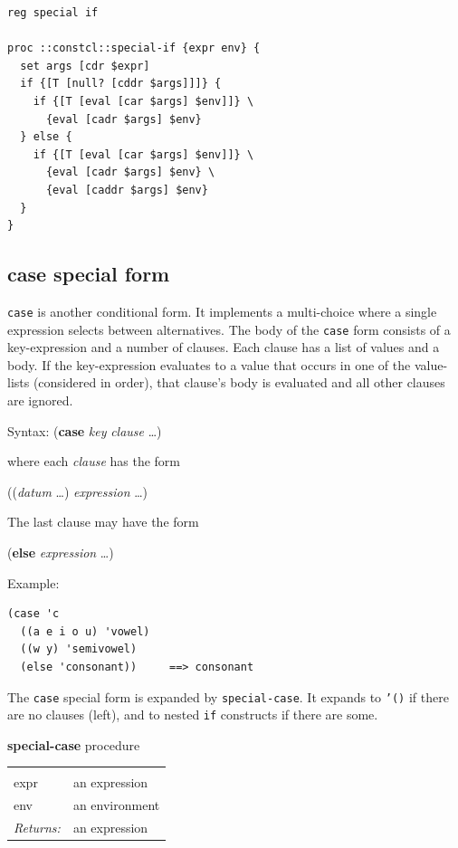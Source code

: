 \documentclass[twoside]{report}
\begin{document}
\begin{lstlisting}
reg special if

proc ::constcl::special-if {expr env} {
  set args [cdr $expr]
  if {[T [null? [cddr $args]]]} {
    if {[T [eval [car $args] $env]]} \
      {eval [cadr $args] $env}
  } else {
    if {[T [eval [car $args] $env]]} \
      {eval [cadr $args] $env} \
      {eval [caddr $args] $env}
  }
}
\end{lstlisting}

\subsection{case special form}
\label{case-special-form}

\texttt{case} is another conditional form. It implements a multi-choice where a single expression selects between alternatives. The body of the \texttt{case} form consists of a key-expression and a number of clauses. Each clause has a list of values and a body. If the key-expression evaluates to a value that occurs in one of the value-lists (considered in order), that clause's body is evaluated and all other clauses are ignored.

Syntax: (\textbf{case} \emph{key} \emph{clause} \ldots )

where each \emph{clause} has the form

((\emph{datum} \ldots ) \emph{expression} \ldots )

The last clause may have the form

(\textbf{else} \emph{expression} \ldots )

Example:

\begin{verbatim}
(case 'c
  ((a e i o u) 'vowel)
  ((w y) 'semivowel)
  (else 'consonant))     ==> consonant
\end{verbatim}

The \texttt{case} special form is expanded by \texttt{special-case}. It expands to \texttt{'()} if there are no clauses (left), and to nested \texttt{if} constructs if there are some.

\textbf{special-case} procedure

\noindent\begin{tabular}{ |p{1.9cm} p{8cm}| }
\hline
\rowcolor[HTML]{CCCCCC} \multicolumn{2}{|l|}{\bf special-case (internal)} \\
expr & an expression \\
env & an environment \\
\textit{Returns:} & an expression \\
\hline
\end{tabular}
\end{document}
